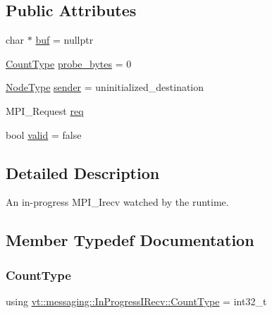 \subsection*{Public Attributes}
\begin{DoxyCompactItemize}
\item 
char $\ast$ \hyperlink{structvt_1_1messaging_1_1_in_progress_i_recv_a9b9fa3b3405847857324d448dee6abc9}{buf} = nullptr
\item 
\hyperlink{structvt_1_1messaging_1_1_in_progress_i_recv_a2a3824ca08dcfc5a3278882c1df8edd6}{Count\+Type} \hyperlink{structvt_1_1messaging_1_1_in_progress_i_recv_a5964aaf33b76900f1dc5bb2b4ec739ef}{probe\+\_\+bytes} = 0
\item 
\hyperlink{namespacevt_a866da9d0efc19c0a1ce79e9e492f47e2}{Node\+Type} \hyperlink{structvt_1_1messaging_1_1_in_progress_i_recv_ae7eeec91801680c76b80bb30c776dd6c}{sender} = uninitialized\+\_\+destination
\item 
M\+P\+I\+\_\+\+Request \hyperlink{structvt_1_1messaging_1_1_in_progress_i_recv_af1ee8d3168a064aa7749b986439b81e8}{req}
\item 
bool \hyperlink{structvt_1_1messaging_1_1_in_progress_i_recv_a77b0720a369e9a8dcb246548faa381b7}{valid} = false
\end{DoxyCompactItemize}


\subsection{Detailed Description}
An in-\/progress M\+P\+I\+\_\+\+Irecv watched by the runtime. 

\subsection{Member Typedef Documentation}
\mbox{\label{structvt_1_1messaging_1_1_in_progress_i_recv_a2a3824ca08dcfc5a3278882c1df8edd6}} 
\subsubsection{\texorpdfstring{Count\+Type}{CountType}}
{\footnotesize\ttfamily using \hyperlink{structvt_1_1messaging_1_1_in_progress_i_recv_a2a3824ca08dcfc5a3278882c1df8edd6}{vt\+::messaging\+::\+In\+Progress\+I\+Recv\+::\+Count\+Type} =  int32\+\_\+t}



